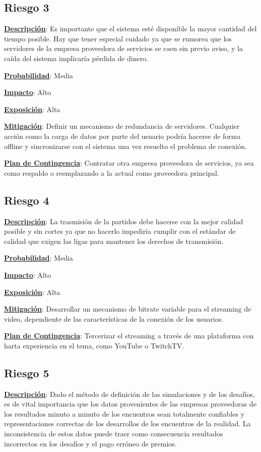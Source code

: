 \subsection*{Riesgo 3}
\textbf{\underline{Descripción}}: Es importante que el sistema esté disponible la mayor cantidad del tiempo posible. Hay que tener especial cuidado ya que se rumorea que los servidores de la empresa proveedora de servicios se caen sin previo aviso, y la caída del sistema implicaría pérdida de dinero.

\textbf{\underline{Probabilidad}}: Media

\textbf{\underline{Impacto}}: Alto

\textbf{\underline{Exposición}}: Alta

\textbf{\underline{Mitigación}}: Definir un mecanismo de redundancia de servidores. Cualquier acción como la carga de datos por parte del usuario podría hacerse de forma offline y sincronizarse con el sistema una vez resuelto el problema de conexión.

\textbf{\underline{Plan de Contingencia}}: Contratar otra empresa proveedora de servicios, ya sea como respaldo o reemplazando a la actual como proveedora principal.


\subsection*{Riesgo 4} 
\textbf{\underline{Descripción}}: La trasmisión de la partidos debe hacerse con la mejor calidad posible y sin cortes ya que no hacerlo impediría cumplir con el estándar de calidad que exigen las ligas para mantener los derechos de transmisión.

\textbf{\underline{Probabilidad}}: Media

\textbf{\underline{Impacto}}: Alto

\textbf{\underline{Exposición}}: Alta

\textbf{\underline{Mitigación}}: Desarrollar un mecanismo de bitrate variable para el streaming de video, dependiente de las características de la conexión de los usuarios.

\textbf{\underline{Plan de Contingencia}}: Tercerizar el streaming a través de una plataforma con harta experiencia en el tema, como YouTube o TwitchTV.


\subsection*{Riesgo 5}
\textbf{\underline{Descripción}}: Dado el método de definición de las simulaciones y de los desafíos, es de vital
importancia que los datos provenientes de las empresas proveedoras de los resultados minuto a minuto de los encuentros sean totalmente confiables y representaciones correctas de los desarrollos de los encuentros de la realidad. La inconsistencia de estos datos puede traer como consecuencia resultados incorrectos en los desafíos y el pago erróneo de premios.

